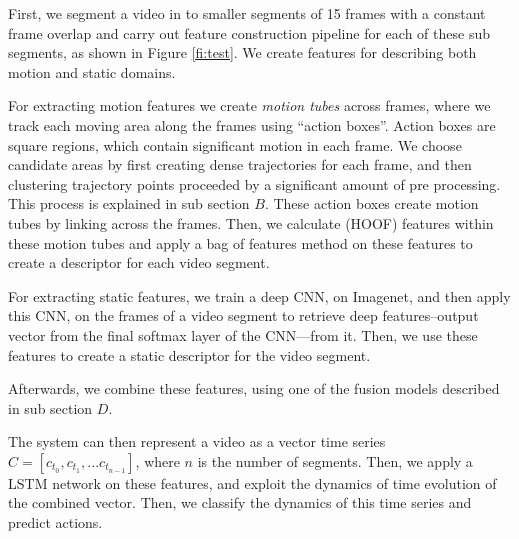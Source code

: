 First, we segment a video in to smaller segments of 15 frames with a constant frame overlap
and carry out feature construction pipeline for each of these sub segments, as shown in Figure \ref{fi:test}. 
We create features for describing both motion and static domains.

For extracting motion features we create \textit{motion tubes} across frames, where we track each moving area along the frames using ``action boxes''.
Action boxes are square regions, which contain significant motion in each frame. We choose candidate areas by first creating dense trajectories for each frame,
and then clustering trajectory points proceeded by a significant amount of pre processing. This process is explained in sub section $B$.
These action boxes create motion tubes by linking across the frames. Then, we calculate (HOOF)\cite{chaudhry2009histograms} features within these motion tubes and apply a  
bag of features
method on these features to create a descriptor for each video segment. 

For extracting static features, we train a deep CNN, on Imagenet, and then apply this CNN,
on the frames of a video segment to retrieve deep features--output vector from the final softmax layer of the CNN---from it. Then, we use these features
to create a static descriptor for the video segment.

Afterwards, we combine these features, using one of the fusion models described in sub section $D$.

The system can then represent a video as a vector time series $C = [c_{t_0}, c_{t_1}, ...c_{t_{n-1}}]$,
where $n$ is the number of segments. Then, we apply a LSTM network on these features, and exploit the dynamics of time evolution of the combined vector.
Then, we classify the dynamics of this time series and predict actions.



